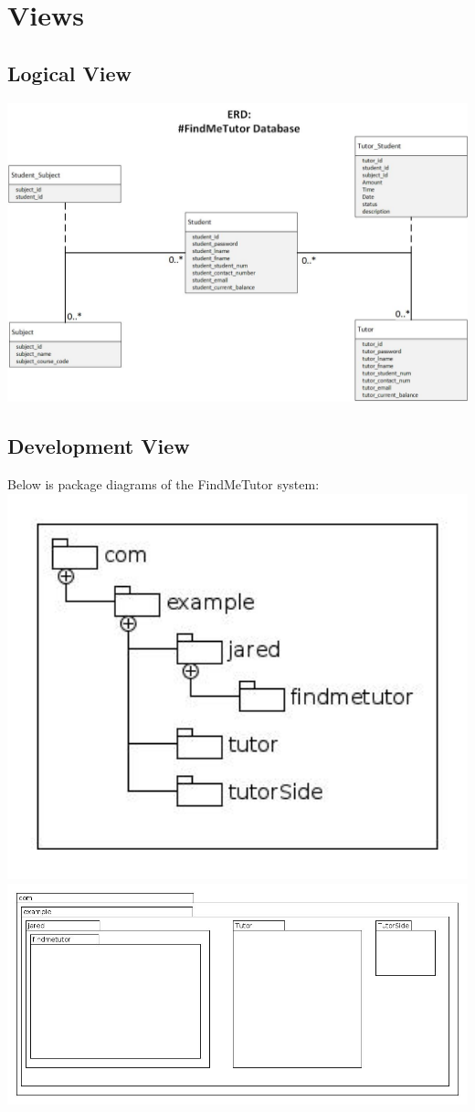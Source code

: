 \documentclass[12pt]{article}
\begin{document}
\section{Views}
\subsection{Logical View}
\includegraphics[width=140mm]{./class_diagram_findme_tutor.jpg}
\subsection{Development View}
Below is package diagrams of the FindMeTutor system:\\
\includegraphics[width=140mm]{./Pakage.jpg}
\includegraphics[width=140mm]{./Pakage2.jpg}
\end{document}
